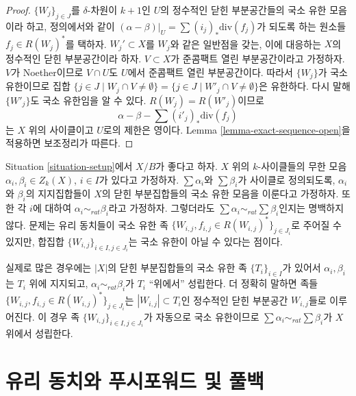 \begin{proof}
$\{W_j\}_{j \in J}$를 $\delta$-차원이 $k + 1$인 $U$의 정수적인
닫힌 부분공간들의 국소 유한 모음이라 하고, 정의에서와 같이
$(\alpha - \beta)|_U = \sum (i_j)_*\text{div}(f_j)$가 되도록 하는
원소들 $f_j \in R(W_j)^*$를 택하자. $W_j' \subset X$를
$W_j$와 같은 일반점을 갖는, 이에 대응하는 $X$의 정수적인 닫힌
부분공간이라 하자. $V \subset X$가 준콤팩트 열린 부분공간이라고
가정하자. $V$가 Noether이므로 $V \cap U$도 $U$에서 준콤팩트
열린 부분공간이다. 따라서 $\{W_j\}$가 국소 유한이므로 집합
$\{j \in J \mid W_j \cap V \not = \emptyset\}
= \{j \in J \mid W'_j \cap V \not = \emptyset\}$은 유한하다.
다시 말해 $\{W'_j\}$도 국소 유한임을 알 수 있다.
$R(W_j) = R(W'_j)$이므로
$$
\alpha - \beta - \sum (i'_j)_*\text{div}(f_j)
$$
는 $X$ 위의 사이클이고 $U$로의 제한은 영이다.
Lemma \ref{lemma-exact-sequence-open}을 적용하면 보조정리가 따른다.
\end{proof}

\begin{remark}
\label{remark-infinite-sums-rational-equivalences}
Situation \ref{situation-setup}에서 $X/B$가 좋다고 하자.
$X$ 위의 $k$-사이클들의 무한 모음
$\alpha_i, \beta_i \in Z_k(X)$, $i \in I$가 있다고 가정하자.
$\sum \alpha_i$와 $\sum \beta_i$가 사이클로 정의되도록,
$\alpha_i$와 $\beta_i$의 지지집합들이 $X$의 닫힌 부분집합들의
국소 유한 모음을 이룬다고 가정하자. 또한 각 $i$에 대하여
$\alpha_i \sim_{rat} \beta_i$라고 가정하자. 그렇더라도
$\sum \alpha_i \sim_{rat} \sum \beta_i$인지는 명백하지 않다.
문제는 유리 동치들이 국소 유한 족
$\{W_{i, j}, f_{i, j} \in R(W_{i, j})^*\}_{j \in J_i}$로 주어질
수 있지만, 합집합 $\{W_{i, j}\}_{i \in I, j\in J_i}$는 국소
유한이 아닐 수 있다는 점이다.

\medskip\noindent
실제로 많은 경우에는 $|X|$의 닫힌 부분집합들의 국소 유한 족
$\{T_i\}_{i \in I}$가 있어서 $\alpha_i, \beta_i$는 $T_i$ 위에
지지되고, $\alpha_i \sim_{rat} \beta_i$가 $T_i$ ``위에서''
성립한다. 더 정확히 말하면 족들
$\{W_{i, j}, f_{i, j} \in R(W_{i, j})^*\}_{j \in J_i}$는
$|W_{i, j}| \subset T_i$인 정수적인 닫힌 부분공간 $W_{i, j}$들로
이루어진다. 이 경우 족
$\{W_{i, j}\}_{i \in I, j\in J_i}$가 자동으로 국소 유한이므로
$\sum \alpha_i \sim_{rat} \sum \beta_i$가 $X$ 위에서 성립한다.
\end{remark}

\section{유리 동치와 푸시포워드 및 풀백}
\label{section-properties-rational-equivalence}


